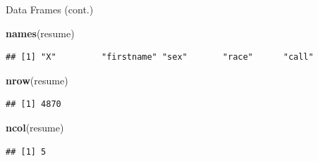 \documentclass[ignorenonframetext,]{beamer}
\newenvironment{Shaded}{\begin{snugshade}}{\end{snugshade}}
\newcommand{\KeywordTok}[1]{\textcolor[rgb]{0.13,0.29,0.53}{\textbf{#1}}}
\newcommand{\NormalTok}[1]{#1}
\begin{document}
\begin{frame}[fragile]{Data Frames (cont.)}

\begin{Shaded}
\begin{Highlighting}[]
\KeywordTok{names}\NormalTok{(resume)}
\end{Highlighting}
\end{Shaded}

\begin{verbatim}
## [1] "X"         "firstname" "sex"       "race"      "call"
\end{verbatim}

\begin{Shaded}
\begin{Highlighting}[]
\KeywordTok{nrow}\NormalTok{(resume)}
\end{Highlighting}
\end{Shaded}

\begin{verbatim}
## [1] 4870
\end{verbatim}

\begin{Shaded}
\begin{Highlighting}[]
\KeywordTok{ncol}\NormalTok{(resume)}
\end{Highlighting}
\end{Shaded}

\begin{verbatim}
## [1] 5
\end{verbatim}

\end{frame}
\end{document}
